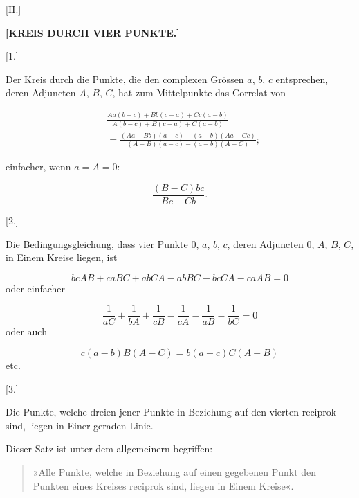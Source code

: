 
\begin{center}
[II.]

\textbf{[KREIS DURCH VIER PUNKTE.]}

[1.]
\end{center}

Der Kreis durch die Punkte, die den complexen Gr\"ossen $a$, $b$, $c$ entsprechen, deren Adjuncten $A$, $B$, $C$, hat zum Mittelpunkte das Correlat von

\[
\begin{aligned}
&\frac{Aa(b-c)+Bb(c-a)+Cc(a-b)}{A(b-c)+B(c-a)+C(a-b)} \\
&= \frac{(Aa-Bb)(a-c)-(a-b)(Aa-Cc)}{(A-B)(a-c)-(a-b)(A-C)};
\end{aligned}
\]

einfacher, wenn $a=A=0$:

\[
\frac{(B-C)bc}{Bc-Cb}.
\]

\begin{center}
[2.]
\end{center}

Die Bedingungsgleichung, dass vier Punkte $0$, $a$, $b$, $c$, deren Adjuncten
$0$, $A$, $B$, $C$, in Einem Kreise liegen, ist

\[
bcAB+caBC+abCA-abBC-bcCA-caAB = 0
\]
oder einfacher

\[
\frac{1}{aC}+\frac{1}{bA}+\frac{1}{cB}-\frac{1}{cA}-\frac{1}{aB}-\frac{1}{bC} = 0
\]
oder auch

\[
c(a-b)B(A-C) = b(a-c)C(A-B)
\]
etc.

\begin{center}
[3.]
\end{center}

Die Punkte, welche dreien jener Punkte in Beziehung auf den vierten
reciprok sind, liegen in Einer geraden Linie.

Dieser Satz ist unter dem allgemeinern begriffen:

\begin{quote}
»Alle Punkte, welche in Beziehung auf einen gegebenen Punkt den
Punkten eines Kreises reciprok sind, liegen in Einem Kreise«.
\end{quote}
